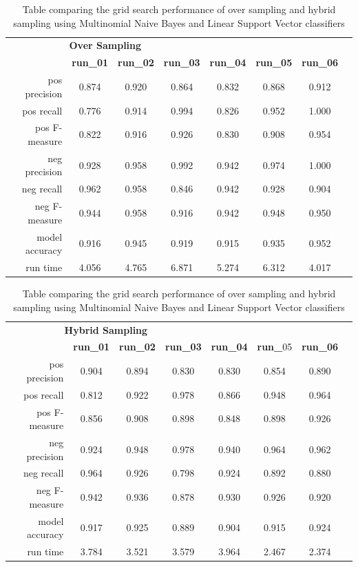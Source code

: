 \begin{table}[h]
\centering
\caption[Performance comparison of over sampling and hybrid sampling]{Table comparing the grid search performance of over sampling and hybrid sampling using Multinomial Naive Bayes and Linear Support Vector classifiers}
\label{tab:chapter5:grid_search_performance_comparison}

\begin{tabular}{rccccccc}
	\toprule
	\multicolumn{4}{c}{\textbf{Over Sampling}} \\
	\cmidrule(r){1-4}
	 & \textbf{run\_01} & \textbf{run\_02} & \textbf{run\_03} & \textbf{run\_04} & \textbf{run\_05} & \textbf{run\_06} \\
	\midrule
	pos precision & 0.874 & 0.920 & 0.864 & 0.832 & 0.868 & 0.912 \\
	pos recall & 0.776 & 0.914 & 0.994 & 0.826 & 0.952 & 1.000 \\
	pos F-measure & 0.822 & 0.916 & 0.926 & 0.830 & 0.908 & 0.954 \\
	neg precision & 0.928 & 0.958 & 0.992 & 0.942 & 0.974 & 1.000 \\
	neg recall & 0.962 & 0.958 & 0.846 & 0.942 & 0.928 & 0.904 \\
	neg F-measure & 0.944 & 0.958 & 0.916 & 0.942 & 0.948 & 0.950 \\
	model accuracy & 0.916 & 0.945 & 0.919 & 0.915 & 0.935 & 0.952 \\
	run time & 4.056 & 4.765 & 6.871 & 5.274 & 6.312 & 4.017 \\
	\bottomrule
\end{tabular}

\begin{tabular}{rccccccc}
	\multicolumn{4}{c}{\textbf{Hybrid Sampling}} \\
	\cmidrule(r){1-4}
	 & \textbf{run\_01} & \textbf{run\_02} & \textbf{run\_03} & \textbf{run\_04} & \textbf{run\_}05 & \textbf{run\_06} \\
    \midrule
	pos precision & 0.904 & 0.894 & 0.830 & 0.830 & 0.854 & 0.890 \\
	pos recall & 0.812 & 0.922 & 0.978 & 0.866 & 0.948 & 0.964 \\
	pos F-measure & 0.856 & 0.908 & 0.898 & 0.848 & 0.898 & 0.926 \\
	neg precision & 0.924 & 0.948 & 0.978 & 0.940 & 0.964 & 0.962 \\
	neg recall & 0.964 & 0.926 & 0.798 & 0.924 & 0.892 & 0.880 \\
	neg F-measure & 0.942 & 0.936 & 0.878 & 0.930 & 0.926 & 0.920 \\
	model accuracy & 0.917 & 0.925 & 0.889 & 0.904 & 0.915 & 0.924 \\
	run time & 3.784 & 3.521 & 3.579 & 3.964 & 2.467 & 2.374 \\
    \bottomrule
\end{tabular}


\end{table}
